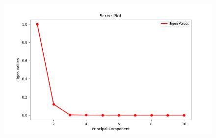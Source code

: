 \documentclass[12pt]{scrartcl}
\begin{document}
\begin{figure}[h]
    		
    		\includegraphics[scale=0.5]{5_10_S.png}
    		
\end{figure}
\newpage
\end{document}
